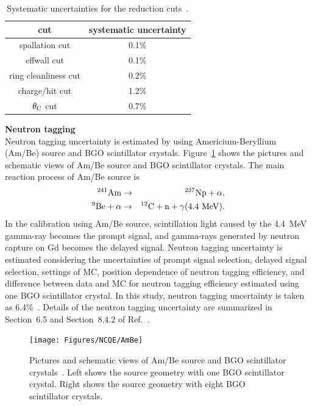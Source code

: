 \begin{table}[h]
	\centering
	\caption[Systematic uncertainties for the reduction cuts]{
	Systematic uncertainties for the reduction cuts~\cite{2021Abe}.
	}\label{tab:Redu}
	\vs
	\begin{tabular}{cc} \hline \hline
		cut                  & systematic uncertainty \\ \hline
		spallation cut       & 0.1\%                  \\
		effwall cut          & 0.1\%                  \\
		ring cleanliness cut & 0.2\%                  \\
		charge/hit cut       & 1.2\%                  \\
		$\theta_{\rm C}$ cut & 0.7\%                  \\ \hline \hline
	\end{tabular}
\end{table}

\textbf{Neutron tagging}\\
\hs
Neutron tagging uncertainty is estimated by using Americium-Beryllium (Am/Be) source and BGO scintillator crystals.
Figure~\ref{NCQE_AmBe} shows the pictures and schematic views of Am/Be source and BGO scintillator crystals.
The main reaction process of Am/Be source is
\begin{eqnarray}
	^{241}{\rm Am}        & \to & ^{237}{\rm Np} + \alpha, \\
	^{9}{\rm Be} + \alpha & \to & ^{12}{\rm C} + {\rm n} + \gamma(4.4~{\rm MeV}).
\end{eqnarray}
In the calibration using Am/Be source, scintillation light caused by the 4.4~MeV gamma-ray becomes the prompt signal, and gamma-rays generated by neutron capture on Gd becomes the delayed signal.
Neutron tagging uncertainty is estimated considering the uncertainties of prompt signal selection, delayed signal selection, settings of MC, position dependence of neutron tagging efficiency, and difference between data and MC for neutron tagging efficiency estimated using one BGO scintillator crystal.
In this study, neutron tagging uncertainty is taken as 6.4\%~\cite{2022HaradaSlide,2023Harada}.
Details of the neutron tagging uncertainty are summarized in Section~6.5 and Section~8.4.2 of Ref.~\cite{2023HaradaPhD}.\\

\begin{figure}[H]
	\centering
	\texttt{[image: Figures/NCQE/AmBe]}
	\caption[Pictures and schematic views of Am/Be source and BGO scintillator crystals]{
	Pictures and schematic views of Am/Be source and BGO scintillator crystals~\cite{2023HaradaPhD}.
	Left shows the source geometry with one BGO scintillator crystal.
	Right shows the source geometry with eight BGO scintillator crystals.
	}\label{NCQE_AmBe}
\end{figure}

